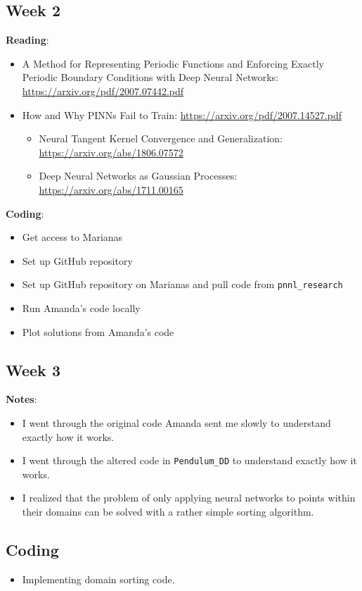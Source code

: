 \documentclass{article}
\def\bf{\textbf}
\begin{document}
\subsection*{Week 2}
\bf{Reading}:
\begin{itemize}
	\item A Method for Representing Periodic Functions and Enforcing Exactly Periodic Boundary Conditions with Deep Neural Networks: \url{https://arxiv.org/pdf/2007.07442.pdf}
	\item How and Why PINNs Fail to Train: \url{https://arxiv.org/pdf/2007.14527.pdf}
	\begin{itemize}
		\item Neural Tangent Kernel Convergence and Generalization: \url{https://arxiv.org/abs/1806.07572}
		\item Deep Neural Networks as Gaussian Processes: \url{https://arxiv.org/abs/1711.00165}
	\end{itemize}
\end{itemize}
\bf{Coding}:
\begin{itemize}
\item Get access to Marianas
\item Set up GitHub repository
\item Set up GitHub repository on Marianas and pull code from \verb|pnnl_research|
\item Run Amanda's code locally
\item Plot solutions from Amanda's code
\end{itemize}
\newpage
\subsection*{Week 3} 
\bf{Notes}:
\begin{itemize}
\item I went through the original code Amanda sent me slowly to understand exactly how it works.
\item I went through the altered code in \verb|Pendulum_DD| to understand exactly how it works.
\item I realized that the problem of only applying neural networks to points within their domains can be solved with a rather simple sorting algorithm.
\end{itemize}
\subsection*{Coding}
\begin{itemize}
\item Implementing domain sorting code.
\end{itemize}
\newpage
\end{document}
